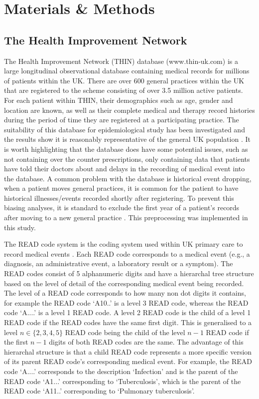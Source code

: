 \documentclass{llncs}
\begin{document}
\section{Materials \& Methods}
\subsection{The Health Improvement Network}
The Health Improvement Network (THIN) database (www.thin-uk.com) is a large longitudinal observational database containing medical records for millions of patients within the UK. There are over 600 general practices within the UK that are registered to the scheme consisting of over 3.5 million active patients. For each patient within THIN, their demographics such as age, gender and location are known, as well as their complete medical and therapy record histories during the period of time they are registered at a participating practice. The suitability of this database for epidemiological study has been investigated and the results show it is reasonably representative of the general UK population \cite{THIN}. It is worth highlighting that the database does have some potential issues, such as not containing over the counter prescriptions, only containing data that patients have told their doctors about and delays in the recording of medical event into the database. A common problem with the database is historical event dropping, when a patient moves general practices, it is common for the patient to have historical illnesses/events recorded shortly after registering. To prevent this biasing analyses, it is standard to exclude the first year of a patient's records after moving to a new general practice \cite{Lewis2006}. This preprocessing was implemented in this study.

The READ code system is the coding system used within UK primary care to record medical events \cite{READ}. Each READ code corresponds to a medical event (e.g., a diagnosis, an administrative event, a laboratory result or a symptom). The READ codes consist of 5 alphanumeric digits and have a hierarchal tree structure based on the level of detail of the corresponding medical event being recorded. The level of a READ code corresponds to how many non dot digits it contains, for example the READ code `A10..' is a level 3 READ code, whereas the READ code `A....' is a level 1 READ code. A level 2 READ code is the child of a level 1 READ code if the READ codes have the same first digit. This is generalised to a level $n\in \{2,3,4,5\}$ READ code being the child of the level $n-1$ READ code if the first $n-1$ digits of both READ codes are the same. The advantage of this hierarchal structure is that a child READ code represents a more specific version of its parent READ code's corresponding medical event. For example, the READ code `A....' corresponds to the description `Infection' and is the parent of the READ code `A1...' corresponding to `Tuberculosis', which is the parent of the READ code `A11..' corresponding to `Pulmonary tuberculosis'.
\end{document}
